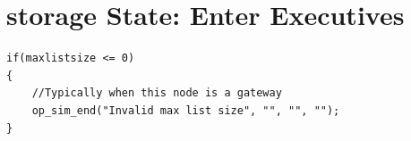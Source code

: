 \section{storage State: Enter Executives}
{\tiny
\begin{verbatim}
if(maxlistsize <= 0)
{
	//Typically when this node is a gateway
	op_sim_end("Invalid max list size", "", "", "");
}
\end{verbatim}
}
